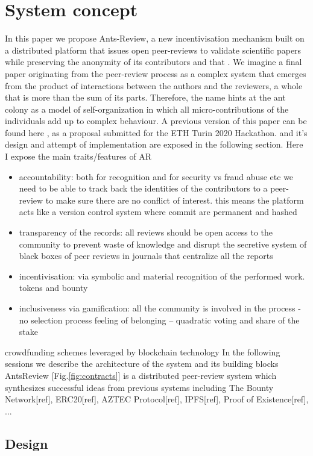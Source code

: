 \documentclass[runningheads]{llncs}
\begin{document}
\section{System concept}
In this paper we propose Ants-Review, a new incentivisation mechanism built on a distributed platform that issues open peer-reviews to validate scientific papers while preserving the anonymity of its contributors and that . We imagine a final paper originating from the peer-review process as a complex system that emerges from the product of interactions between the authors and the reviewers, a whole that is more than the sum of its parts. Therefore, the name hints at the ant colony as a model of self-organization in which all micro-contributions of the individuals add up to complex behaviour.
A previous version of this paper can be found here \cite{AntsReview}, as a proposal submitted for the ETH Turin 2020 Hackathon.
and it’s design and attempt of implementation are exposed in the following section.
Here I expose the main traits/features of AR
\begin{itemize}
\item accountability: both for recognition and for security vs fraud abuse etc we need to be able to track back the identities of the contributors to a peer-review to make sure there are no conflict of interest. this means the platform acts like a version control system where commit are permanent and hashed 
\item transparency of the records: all reviews should be open access to the community to prevent waste of knowledge and disrupt the secretive system of black boxes of peer reviews in journals that centralize all the reports 
\item incentivisation: via symbolic and material recognition of the performed work. tokens and bounty
\item inclusiveness via gamification: all the community is involved in the process - no selection process feeling of belonging -- quadratic voting and share of the stake
\end{itemize}
crowdfunding schemes leveraged by blockchain technology
In the following sessions we describe the architecture of the system and its building blocks
AntsReview [Fig.\ref{fig:contracts}] is a distributed peer-review system which synthesizes successful ideas from previous systems including The Bounty Network[ref], ERC20[ref], AZTEC Protocol[ref], IPFS[ref], Proof of Existence[ref], ...

\subsection{Design}
\end{document}
